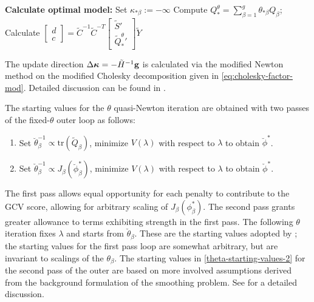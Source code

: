 \documentclass[12pt]{article}
\newcommand{\bfkappa}{\mbox{\boldmath $\kappa$}}
\newcommand{\tildeY}{\tilde{Y}}
\newcommand{\tildeQ}{\tilde{Q}}
\newcommand{\tildeS}{\tilde{S}}
\theoremstyle{definition}
\begin{document}
\begin{algorithm}[H]
\begin{algorithmic}
			\ENDIF
	\ENDWHILE
\STATE \textbf{Calculate optimal model:} 
		\STATE Set $\kappa_{*\beta} := -\infty$
	\ENDIF
	\STATE Compute $Q_*^\theta = \sum_{\beta = 1}^g \theta_{*\beta} Q_\beta$;
	\STATE Calculate $\begin{bmatrix} d \\ c \end{bmatrix} = \tilde{C}^{-1} \tilde{C}^{-T} \begin{bmatrix} \tildeS' \\ {\tildeQ_*^\theta}' \end{bmatrix} \tildeY$
					
\end{algorithmic}
\end{algorithm}

The update direction $\Delta \bfkappa = -\tilde{H}^{-1} \mathbf{g}$ is calculated via the modified Newton method on the modified Cholesky decomposition given in \ref{eq:cholesky-factor-mod}. Detailed discussion can be found in \citet{gill1981practical}.
\bigskip

The starting values for the $\theta$ quasi-Newton iteration are obtained with two passes of the fixed-$\theta$ outer loop as follows:

\begin{enumerate}
\item Set $\breve{\theta}_\beta^{-1} \propto \mbox{tr}\left( \tildeQ_\beta \right)$, minimize $V\left(\lambda\right)$ with respect to $\lambda$ to obtain $\breve{\phi}^*$. \label{theta-starting-values-1}
\item Set $\check{\theta}_\beta^{-1} \propto  J_\beta\left(\breve{\phi}^*_\beta \right)$, minimize $V\left(\lambda\right)$ with respect to $\lambda$ to obtain $\check{\phi}^*$. \label{theta-starting-values-2}
\end{enumerate}
\noindent
The first pass allows equal opportunity for each penalty to contribute to the GCV score, allowing for arbitrary scaling of $J_\beta \left(\phi^*_\beta\right)$. The second pass grants greater allowance to terms exhibiting strength in the first pass. The following $\theta$ iteration fixes $\lambda$ and starts from $\check{\theta}_\beta$. These are the starting values adopted by \citet{gu1991minimizing}; the starting values for the first pass loop are somewhat arbitrary, but are invariant to scalings of the $\theta_\beta$. The starting values in \ref{theta-starting-values-2} for the second pass of the outer are based on more involved assumptions derived from the background formulation of the smoothing problem. See \citet{gu1991minimizing} for a detailed discussion.
\end{document}
